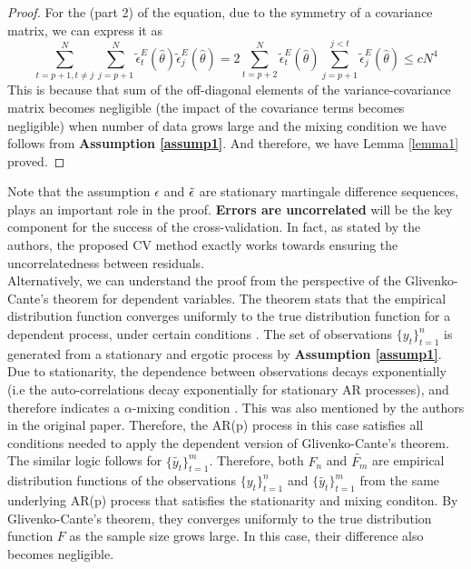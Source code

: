 \documentclass[12pt, oneside]{amsart}
\theoremstyle{definition}
\theoremstyle{remark}
\numberwithin{equation}{section}
\begin{document}
\begin{proof}
For the (part 2) of the equation, due to the symmetry of a covariance matrix, we can express it as
$$\sum^N_{t=p+1, t\not = j} \sum^N_{j=p+1} \tilde{\epsilon}^E_t(\hat{\theta}) \tilde{\epsilon}^E_j(\hat{\theta}) = 2 
\sum^N_{t=p+2}\tilde{\epsilon}^E_t(\hat{\theta}) 
\sum^{j < t}_{j=p+1} \tilde{\epsilon}^E_j(\hat{\theta}) \leq cN^4
$$
This is because that sum of the off-diagonal elements of the variance-covariance matrix becomes negligible (the impact of the covariance terms becomes negligible) when number of data grows large and the mixing condition we have follows from \textbf{Assumption \ref{assump1}}. And therefore, we have Lemma \ref{lemma1} proved. 
\end{proof}



Note that the assumption $\epsilon$ and $\Tilde{\epsilon}$ are stationary martingale difference sequences, plays an important role in the proof. \textbf{Errors are uncorrelated} will be the key component for the success of the cross-validation. In fact, as stated by the authors, the proposed CV method exactly works towards ensuring the uncorrelatedness between residuals.
\\

Alternatively, we can understand the proof from the perspective of the Glivenko-Cante's theorem for dependent variables. The theorem stats that the empirical distribution function converges uniformly to the true distribution function for a dependent process, under certain conditions \citep{Doukhan, Bradley}. The set of observations $\{y_t\}_{t=1}^n$ is generated from a stationary and ergotic process by \textbf{Assumption \ref{assump1}}. Due to stationarity, the dependence between observations decays exponentially (i.e the auto-correlations decay exponentially \citep{Takemura2016} for stationary AR processes),  and therefore indicates a $\alpha$-mixing condition \citep{Brockwell}. This was also mentioned by the authors in the original paper. Therefore, the AR(p) process in this case satisfies all conditions needed to apply the dependent version of Glivenko-Cante's theorem. The similar logic follows for $\{\tilde{y_t}\}_{t=1}^m$. Therefore, both $F_n$ and $\tilde{F_m}$ are empirical distribution functions of the observations $\{y_t\}_{t=1}^n$ and $\{\tilde{y_t}\}_{t=1}^m$ from the same underlying AR(p) process that satisfies the stationarity and mixing conditon. By Glivenko-Cante's theorem, they converges uniformly to the true distribution function $F$ as the sample size grows large. In this case, their difference also becomes negligible. 
\end{document}
